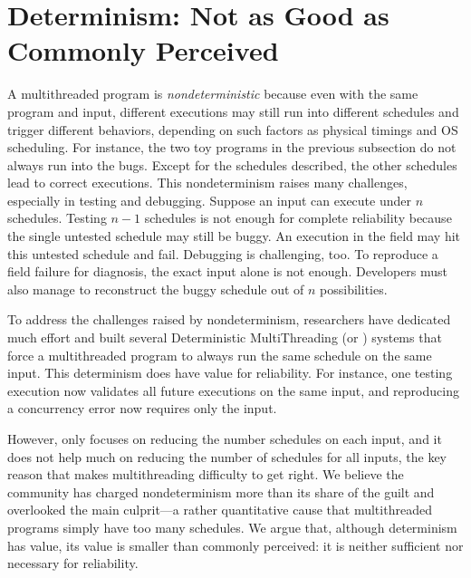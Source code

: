 


\section{Determinism: Not as Good as Commonly Perceived} \label{sec:smt-dmt}

A multithreaded program is \emph{nondeterministic} because even with the same
program and input, different executions may still run into different schedules
and trigger different behaviors, depending on such factors as physical timings
and OS scheduling. For instance, the two toy programs in the previous subsection
do not always run into the bugs.  Except for the schedules described, the
other schedules lead to correct executions. This nondeterminism raises many
challenges, especially in testing and debugging.  Suppose an input can execute
under $n$ schedules. Testing $n-1$ schedules is not enough for complete
reliability because the single untested schedule may still be buggy.  An
execution in the field may hit this untested schedule and fail.  Debugging is
challenging, too. To reproduce a field failure for diagnosis, the exact input
alone is not enough. Developers must also manage to reconstruct the buggy
schedule out of $n$ possibilities.

To address the challenges raised by nondeterminism, researchers have dedicated
much effort and built several Deterministic MultiThreading (or \dmt) systems
that force a multithreaded program to always run the same schedule on the same
input.  This determinism does have value for reliability.  For instance, one
testing execution now validates all future executions on the same input, and 
reproducing a concurrency error now requires only the input.

However, \dmt only focuses on reducing the number schedules on each input, and
it does not help much on reducing the number of schedules for all inputs, the
key reason that makes multithreading difficulty to get right.  We believe the
community has charged nondeterminism more
than its share of the guilt and overlooked the main culprit---a rather
quantitative cause that multithreaded programs simply have too many schedules.
We argue that, although determinism has value, its value is smaller than
commonly perceived: it is neither sufficient nor necessary for reliability.

